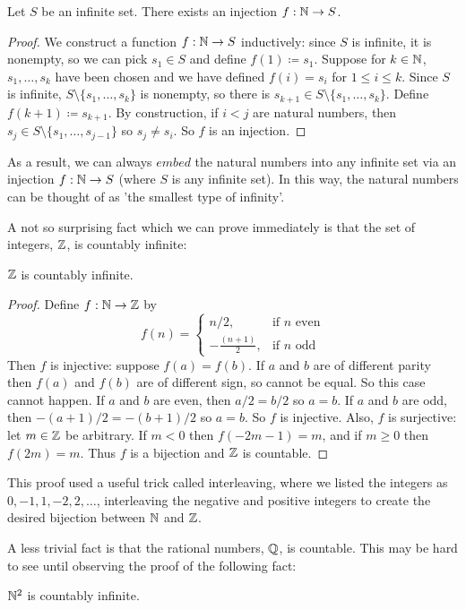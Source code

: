 \documentclass[../analysis1.tex]{subfiles}
\begin{document}
\begin{lemma}
    \begin{shaded*}
        Let $S$ be an infinite set. There exists an injection $f:\mathbb{N}\to S$.
    \end{shaded*}
\end{lemma}
\begin{proof}
    We construct a function $f:\mathbb{N}\to S$ inductively: since
    $S$ is infinite, it is nonempty, so we can pick $s_1\in S$ and define $f(1)\coloneqq s_1$.
    Suppose for $k\in\mathbb{N}$, $s_1,\dots,s_k$ have been chosen and we have defined $f(i)=s_i$ for $1\le i\le k$. Since
    $S$ is infinite, $S\setminus\{s_1,\dots,s_k\}$ is nonempty, so there is $s_{k+1}\in S\setminus \{s_1,\dots,s_k\}$. Define $f(k+1)\coloneqq s_{k+1}$.
    By construction, if $i<j$ are natural numbers, then $s_j\in S\setminus\{s_1,\dots,s_{j-1}\}$ so $s_j\ne s_i$. So $f$ is an injection.\qedhere
\end{proof}
As a result, we can always $embed$ the natural numbers into any infinite set via an injection $f:\mathbb{N}\to S$ (where $S$ is any infinite set).
In this way, the natural numbers can be thought of as 'the smallest type of infinity'.

A not so surprising fact which we can prove immediately is that the set of integers, $\mathbb{Z}$, is countably infinite:
\begin{theorem}
    \begin{shaded*}
        $\mathbb{Z}$ is countably infinite.
    \end{shaded*}
\end{theorem}
\begin{proof}
    Define $f:\mathbb{N}\to \mathbb{Z}$ by $$f(n)=\begin{cases}
    n/2, & \text{if } n\text{ even}\\
    -\frac{(n+1)}{2}, & \text{if }n\text{ odd}
    \end{cases}$$
    Then $f$ is injective: suppose $f(a)=f(b)$. If $a$ and $b$ are of different parity then $f(a)$ and $f(b)$ are of different sign, so cannot be equal. So this case cannot happen.
    If $a$ and $b$ are even, then $a/2=b/2$ so $a=b$. If $a$ and $b$ are odd, then $-(a+1)/2=-(b+1)/2$ so $a=b$. So $f$ is injective.
    Also, $f$ is surjective: let $m\in\mathbb{Z}$ be arbitrary. If $m<0$ then $f(-2m-1)=m$, and if $m\ge 0$ then $f(2m)=m$. Thus $f$ is a bijection and $\mathbb{Z}$ is countable.\qedhere
\end{proof}
\begin{remark}
    This proof used a useful trick called interleaving, where we listed the integers as $0,-1,1,-2,2,\dots$, interleaving the negative and positive integers to create the desired bijection between $\mathbb{N}$ and $\mathbb{Z}$.
\end{remark}  
A less trivial fact is that the rational numbers, $\mathbb{Q}$, is countable. This may be hard to see until observing the proof of the following fact:
\begin{theorem}
\label{thm:N2}
    \begin{shaded*}
        $\mathbb{N}^2$ is countably infinite.
    \end{shaded*}
\end{theorem}
\end{document}

